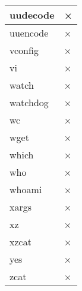 \begin{longtable}{lp{50mm}}
uudecode & × \\ \hline
uuencode & × \\ \hline
vconfig & × \\ \hline
vi & × \\ \hline
watch & × \\ \hline
watchdog & × \\ \hline
wc & × \\ \hline
wget & × \\ \hline
which & × \\ \hline
who & × \\ \hline
whoami & × \\ \hline
xargs & × \\ \hline
xz & × \\ \hline
xzcat & × \\ \hline
yes & × \\ \hline
zcat & × \\ \hline

\end{longtable}
\clearpage
















